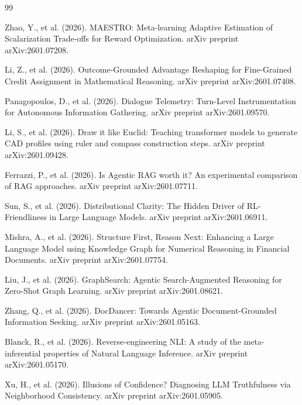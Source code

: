 \documentclass{article}
\begin{document}
\begin{thebibliography}{99}

Zhao, Y., et al. (2026). MAESTRO: Meta-learning Adaptive Estimation of Scalarization Trade-offs for Reward Optimization. arXiv preprint arXiv:2601.07208.

Li, Z., et al. (2026). Outcome-Grounded Advantage Reshaping for Fine-Grained Credit Assignment in Mathematical Reasoning. arXiv preprint arXiv:2601.07408.

Panagopoulos, D., et al. (2026). Dialogue Telemetry: Turn-Level Instrumentation for Autonomous Information Gathering. arXiv preprint arXiv:2601.09570.

Li, S., et al. (2026). Draw it like Euclid: Teaching transformer models to generate CAD profiles using ruler and compass construction steps. arXiv preprint arXiv:2601.09428.

Ferrazzi, P., et al. (2026). Is Agentic RAG worth it? An experimental comparison of RAG approaches. arXiv preprint arXiv:2601.07711.

Sun, S., et al. (2026). Distributional Clarity: The Hidden Driver of RL-Friendliness in Large Language Models. arXiv preprint arXiv:2601.06911.

Mishra, A., et al. (2026). Structure First, Reason Next: Enhancing a Large Language Model using Knowledge Graph for Numerical Reasoning in Financial Documents. arXiv preprint arXiv:2601.07754.

Liu, J., et al. (2026). GraphSearch: Agentic Search-Augmented Reasoning for Zero-Shot Graph Learning. arXiv preprint arXiv:2601.08621.

Zhang, Q., et al. (2026). DocDancer: Towards Agentic Document-Grounded Information Seeking. arXiv preprint arXiv:2601.05163.

Blanck, R., et al. (2026). Reverse-engineering NLI: A study of the meta-inferential properties of Natural Language Inference. arXiv preprint arXiv:2601.05170.

Xu, H., et al. (2026). Illusions of Confidence? Diagnosing LLM Truthfulness via Neighborhood Consistency. arXiv preprint arXiv:2601.05905.


\end{thebibliography}
\end{document}
